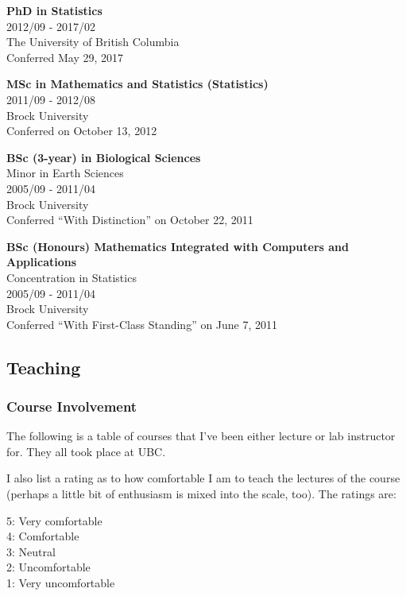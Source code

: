 \documentclass[]{article}
\begin{document}
\textbf{PhD in Statistics}\\
2012/09 - 2017/02\\
The University of British Columbia\\
Conferred May 29, 2017

\textbf{MSc in Mathematics and Statistics (Statistics)}\\
2011/09 - 2012/08\\
Brock University\\
Conferred on October 13, 2012

\textbf{BSc (3-year) in Biological Sciences}\\
Minor in Earth Sciences\\
2005/09 - 2011/04\\
Brock University\\
Conferred ``With Distinction'' on October 22, 2011

\textbf{BSc (Honours) Mathematics Integrated with Computers and Applications}\\
Concentration in Statistics\\
2005/09 - 2011/04\\
Brock University\\
Conferred ``With First-Class Standing'' on June 7, 2011

\hypertarget{teaching}{%
\subsection{Teaching}\label{teaching}}

\hypertarget{course-involvement}{%
\subsubsection{Course Involvement}\label{course-involvement}}

The following is a table of courses that I've been either lecture or lab instructor for. They all took place at UBC.

I also list a rating as to how comfortable I am to teach the lectures of the course (perhaps a little bit of enthusiasm is mixed into the scale, too). The ratings are:

5: Very comfortable\\
4: Comfortable\\
3: Neutral\\
2: Uncomfortable\\
1: Very uncomfortable
\end{document}
